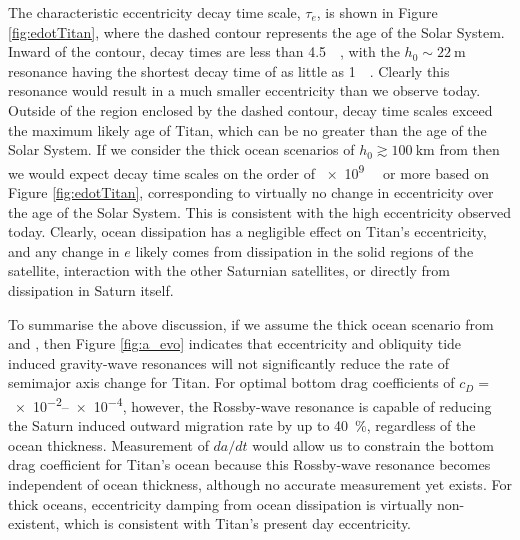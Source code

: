 The characteristic eccentricity decay time scale, $\tau_e$, is shown in Figure \ref{fig:edotTitan}, where the dashed contour represents the age of the Solar System. Inward of the contour, decay times are less than \SI{4.5}{\giga\year}, with the $h_0 \sim \SI{22}{\metre}$ resonance having the shortest decay time of as little as \SI{1}{\mega\year}. Clearly this resonance would result in a much smaller eccentricity than we observe today. Outside of the region enclosed by the dashed contour, decay time scales exceed the maximum likely age of Titan, which can be no greater than the age of the Solar System. If we consider the thick ocean scenarios of $h_0 \gtrsim \SI{100}{\kilo\metre}$ from \citet{baland2014titan, sohl2014structural} then we would expect decay time scales on the order of \SI{e9}{\giga\year} or more based on Figure \ref{fig:edotTitan}, corresponding to virtually no change in eccentricity over the age of the Solar System. This is consistent with the high eccentricity observed today. Clearly, ocean dissipation has a negligible effect on Titan's eccentricity, and any change in $e$ likely comes from dissipation in the solid regions of the satellite, interaction with the other Saturnian satellites, or directly from dissipation in Saturn itself. 

To summarise the above discussion, if we assume the thick ocean scenario from \citet{sohl2014structural} and \citet{baland2014titan}, then Figure \ref{fig:a_evo} indicates that eccentricity and obliquity tide induced gravity-wave resonances will not significantly reduce the rate of semimajor axis change for Titan. For optimal bottom drag coefficients of $c_D = $ \numrange{e-2}{e-4}, however, the Rossby-wave resonance is capable of reducing the Saturn induced outward migration rate by up to \SI{40}{\percent}, regardless of the ocean thickness. Measurement of $da/dt$ would allow us to constrain the bottom drag coefficient for Titan's ocean because this Rossby-wave resonance becomes independent of ocean thickness, although no accurate measurement yet exists. For thick oceans, eccentricity damping from ocean dissipation is virtually non-existent, which is consistent with Titan's present day eccentricity.